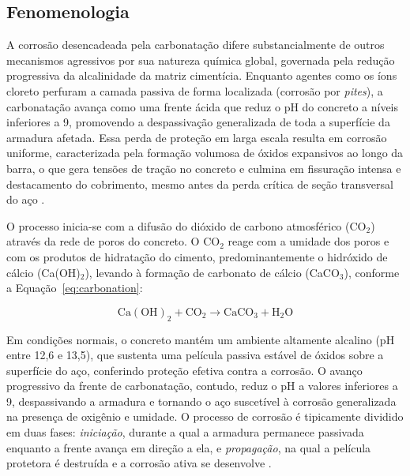 
\subsection{Fenomenologia}
\label{subsec:fenomenologia}

A corrosão desencadeada pela carbonatação difere substancialmente de outros mecanismos agressivos por sua natureza química global, governada pela redução progressiva da alcalinidade da matriz cimentícia. Enquanto agentes como os íons cloreto perfuram a camada passiva de forma localizada (corrosão por \textit{pites}), a carbonatação avança como uma frente ácida que reduz o pH do concreto a níveis inferiores a 9, promovendo a despassivação generalizada de toda a superfície da armadura afetada. Essa perda de proteção em larga escala resulta em corrosão uniforme, caracterizada pela formação volumosa de óxidos expansivos ao longo da barra, o que gera tensões de tração no concreto e culmina em fissuração intensa e destacamento do cobrimento, mesmo antes da perda crítica de seção transversal do aço \citep{tuutti1982}.

O processo inicia-se com a difusão do dióxido de carbono atmosférico (CO$_2$) através da rede de poros do concreto. O CO$_2$ reage com a umidade dos poros e com os produtos de hidratação do cimento, predominantemente o hidróxido de cálcio (Ca(OH)$_2$), levando à formação de carbonato de cálcio (CaCO$_3$), conforme a Equação~\eqref{eq:carbonation}:

\begin{equation}\label{eq:carbonation}
\mathrm{Ca(OH)_2 + CO_2 \rightarrow CaCO_3 + H_2O}
\end{equation}

Em condições normais, o concreto mantém um ambiente altamente alcalino (pH entre 12,6 e 13,5), que sustenta uma película passiva estável de óxidos sobre a superfície do aço, conferindo proteção efetiva contra a corrosão. O avanço progressivo da frente de carbonatação, contudo, reduz o pH a valores inferiores a 9, despassivando a armadura e tornando o aço suscetível à corrosão generalizada na presença de oxigênio e umidade. O processo de corrosão é tipicamente dividido em duas fases: \textit{iniciação}, durante a qual a armadura permanece passivada enquanto a frente avança em direção a ela, e \textit{propagação}, na qual a película protetora é destruída e a corrosão ativa se desenvolve \citep{tuutti1982}.


